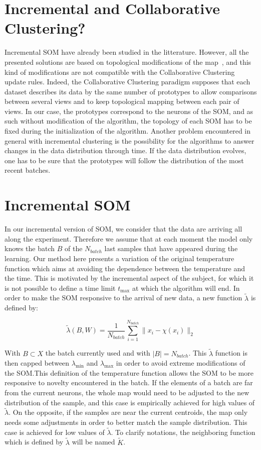 	\section{Incremental and Collaborative Clustering?}
    Incremental SOM have already been studied in the litterature. However, all the presented solutions are based on topological modifications of the map~\cite{deng2000esom,paplinski2012incremental}, and this kind of modifications are not compatible with the Collaborative Clustering update rules. Indeed, the Collaborative Clustering paradigm supposes that each dataset describes its data by the same number of prototypes to allow comparisons between several views and to keep topological mapping between each pair of views. In our case, the prototypes correspond to the neurons of the SOM, and as such without modification of the algorithm, the topology of each SOM has to be fixed during the initialization of the algorithm. Another problem encountered in general with incremental clustering is the possibility for the algorithms to answer changes in the data distribution through time. If the data distribution evolves, one has to be sure that the prototypes will follow the distribution of the most recent batches.
	
	\section{Incremental SOM}
\label{sectionisom}
	In our incremental version of SOM, we consider that the data are arriving all along the experiment. Therefore we assume that at each moment the model only knows the batch $B$ of the $N_{batch}$ last samples that have appeared during the learning.
	Our method here presents a variation of the original temperature function which aims at avoiding the dependence between the temperature and the time. This is motivated by the incremental aspect of the subject, for which it is not possible to define a time limit $t_{\max}$ at which the algorithm will end. In order to make the SOM responsive to the arrival of new data, a new function $\widetilde{\lambda}$ is defined by:
	
	\begin{equation}
	\widetilde{\lambda}(B, W) = \frac{1}{N_{batch}}\sum_{i=1}^{N_{batch}}\|x_i - \chi(x_i)\|_2
	\end{equation}
	
	With $B \subset X$ the batch currently used and with $|B|=N_{batch}$. This $\widetilde{\lambda}$ function is then capped between $\lambda_{\min}$ and $\lambda_{\max}$ in order to avoid extreme modifications of the SOM.\@ This definition of the temperature function allows the SOM to be more responsive to novelty encountered in the batch. If the elements of a batch are far from the current neurons, the whole map would need to be adjusted to the new distribution of the sample, and this case is empirically achieved for high values of $\widetilde{\lambda}$. On the opposite, if the samples are near the current centroids, the map only needs some adjustments in order to better match the sample distribution. This case is achieved for low values of $\widetilde{\lambda}$. To clarify notations, the neighboring function which is defined by $\widetilde{\lambda}$ will be named $\widetilde{K}$.
	
